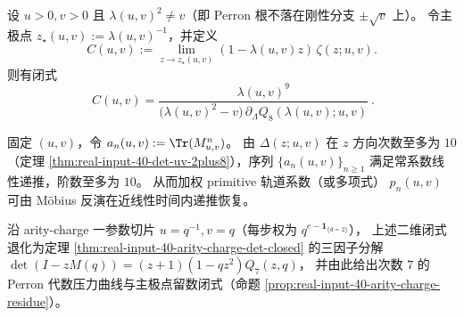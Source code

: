 \begin{proposition}[主极点留数常数的代数闭式]\label{prop:real-input-40-zeta-uv-residue}
设 $u>0,v>0$ 且 $\lambda(u,v)^2\neq v$（即 Perron 根不落在刚性分支 $\pm\sqrt v$ 上）。
令主极点 $z_\star(u,v):=\lambda(u,v)^{-1}$，并定义
\[
C(u,v):=\lim_{z\to z_\star(u,v)}(1-\lambda(u,v)z)\,\zeta(z;u,v).
\]
则有闭式
\[
\boxed{\ C(u,v)=\frac{\lambda(u,v)^9}{\bigl(\lambda(u,v)^2-v\bigr)\,\partial_\Lambda Q_8(\lambda(u,v);u,v)}\ }.
\]
\end{proposition}

\begin{proposition}\label{prop:real-input-40-zeta-uv-recurrence}
固定 $(u,v)$，令
\(
a_n(u,v):=\Tr(M_{u,v}^n)
\)。
由 $\Delta(z;u,v)$ 在 $z$ 方向次数至多为 $10$（定理 \ref{thm:real-input-40-det-uv-2plus8}），序列 $\{a_n(u,v)\}_{n\ge 1}$ 满足常系数线性递推，阶数至多为 $10$。
从而加权 primitive 轨道系数（或多项式）
\(
p_n(u,v)
\)
可由 Möbius 反演在近线性时间内递推恢复。
\end{proposition}

\begin{remark}\label{rem:real-input-40-zeta-uv-chi-specialization}
沿 arity-charge 一参数切片 $u=q^{-1},v=q$（每步权为 $q^{e-\mathbf{1}_{\{d=2\}}}$），
上述二维闭式退化为定理 \ref{thm:real-input-40-arity-charge-det-closed} 的三因子分解
\(
\det(I-zM(q))=(z+1)(1-qz^2)Q_7(z,q)
\)，
并由此给出次数 $7$ 的 Perron 代数压力曲线与主极点留数闭式（命题 \ref{prop:real-input-40-arity-charge-residue}）。
\end{remark}


